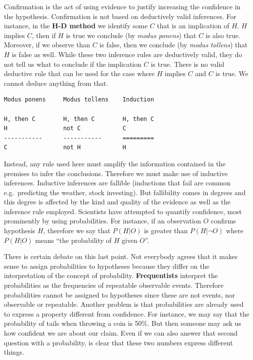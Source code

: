 \documentclass[
]{book}
\begin{document}
Confirmation is the act of using evidence to justify increasing the confidence in the hypothesis.
Confirmation is not based on deductively valid inferences. For instance, in the \textbf{H-D method} we identify some \(C\) that is an implication of \(H\). \(H\) implies \(C\), then if \(H\) is true we conclude (by \emph{modus ponens}) that \(C\) is also true. Moreover, if we observe than \(C\) is false, then we conclude (by \emph{modus tollens}) that \(H\) is false as well. While these two inference rules are deductively valid, they do not tell us what to conclude if the implication \(C\) is true. There is no valid deductive rule that can be used for the case where \(H\) implies \(C\) and \(C\) is true. We cannot deduce anything from that.

\begin{verbatim}
Modus ponens     Modus tollens    Induction

H, then C        H, then C        H, then C
H                not C            C
-----------      -----------      =========
C                not H            H 
\end{verbatim}

Instead, any rule used here must amplify the information contained in the premises to infer the conclusions. Therefore we must make use of inductive inferences. Inductive inferences are fallible (inductions that fail are common e.g.~predicting the weather, stock investing). But fallibility comes in degrees and this degree is affected by the kind and quality of the evidence as well as the inference rule employed. Scientists have attempted to quantify confidence, most prominently by using probabilities. For instance, if an observation \(O\) confirms hypothesis \(H\), therefore we say that \(P(H|O)\) is greater than \(P(H|\lnot O)\) where \(P(H|O)\) means ``the probability of \(H\) given \(O\)''.

There is certain debate on this last point. Not everybody agrees that it makes sense to assign probabilities to hypotheses because they differ on the interpretation of the concept of probability. \textbf{Frequentists} interpret the probabilities as the frequencies of repeatable observable events. Therefore probabilities cannot be assigned to hypotheses since these are not events, nor observable or repeatable. Another problem is that probabilities are already used to express a property different from confidence. For instance, we may say that the probability of tails when throwing a coin is 50\%. But then someone may ask us how confident we are about our claim. Even if we can also answer that second question with a probability, is clear that these two numbers express different things.
\end{document}
